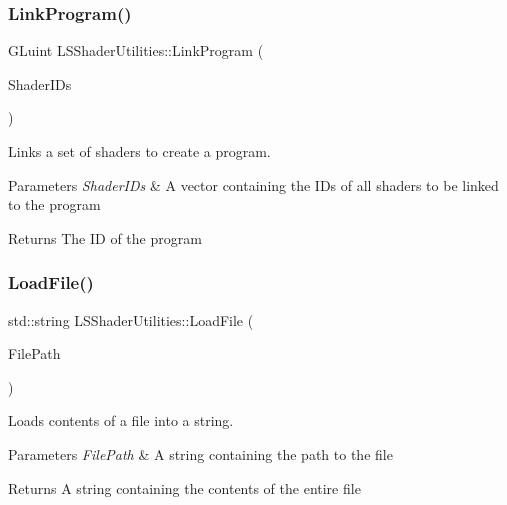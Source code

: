\subsubsection{\texorpdfstring{Link\+Program()}{LinkProgram()}}
{\footnotesize\ttfamily G\+Luint L\+S\+Shader\+Utilities\+::\+Link\+Program (\begin{DoxyParamCaption}\item[{std\+::vector$<$ G\+Luint $>$}]{Shader\+I\+Ds }\end{DoxyParamCaption})}



Links a set of shaders to create a program. 


\begin{DoxyParams}{Parameters}
{\em Shader\+I\+Ds} & A vector containing the I\+Ds of all shaders to be linked to the program \\
\hline
\end{DoxyParams}
\begin{DoxyReturn}{Returns}
The ID of the program 
\end{DoxyReturn}
\mbox{\label{namespace_l_s_shader_utilities_ad1e646e21414567daa2167d625bcdba6}} 
\subsubsection{\texorpdfstring{Load\+File()}{LoadFile()}}
{\footnotesize\ttfamily std\+::string L\+S\+Shader\+Utilities\+::\+Load\+File (\begin{DoxyParamCaption}\item[{const std\+::string \&}]{File\+Path }\end{DoxyParamCaption})}



Loads contents of a file into a string. 


\begin{DoxyParams}{Parameters}
{\em File\+Path} & A string containing the path to the file \\
\hline
\end{DoxyParams}
\begin{DoxyReturn}{Returns}
A string containing the contents of the entire file 
\end{DoxyReturn}
\mbox{\label{namespace_l_s_shader_utilities_a1dd5d9b0ace8599c62360f5d4a96132a}} 
